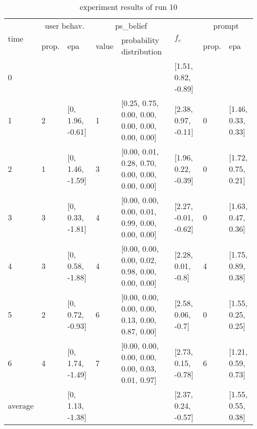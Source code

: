 \begin{table}[htbp]\footnotesize
\caption{experiment results of run 10}
\begin{center}
\begin{tabular}{|p{0.4cm}|p{0.6cm}|l|p{0.6cm}|p{3.3cm}|l|p{0.6cm}|l|}
\hline

\multirow{2}{*}{time} & \multicolumn{2}{c|}{user behav.} & \multicolumn{2}{c|}{ps\_belief} &
\multirow{2}{*}{$f_c$} & \multicolumn{2}{c|}{prompt} \\ \cline{2-5}\cline{ 7- 8}
& prop. & epa & value & probability distribution &  & prop. & epa \\ \hline

0 & \multicolumn{1}{l|}{} &  & \multicolumn{1}{l|}{} &  & [1.51, 0.82, -0.89] & \multicolumn{1}{l|}{} &  \\ \hline
1 & 2 & [0, 1.96, -0.61] & 1 & [0.25, 0.75, 0.00, 0.00, 0.00, 0.00, 0.00, 0.00] & [2.38, 0.97, -0.11] & 0 & [1.46, 0.33, 0.33] \\ \hline
2 & 1 & [0, 1.46, -1.59] & 3 & [0.00, 0.01, 0.28, 0.70, 0.00, 0.00, 0.00, 0.00] & [1.96, 0.22, -0.39] & 0 & [1.72, 0.75, 0.21] \\ \hline
3 & 3 & [0, 0.33, -1.81] & 4 & [0.00, 0.00, 0.00, 0.01, 0.99, 0.00, 0.00, 0.00] & [2.27, -0.01, -0.62] & 0 & [1.63, 0.47, 0.36] \\ \hline
4 & 3 & [0, 0.58, -1.88] & 4 & [0.00, 0.00, 0.00, 0.02, 0.98, 0.00, 0.00, 0.00] & [2.28, 0.01, -0.8] & 4 & [1.75, 0.89, 0.38] \\ \hline
5 & 2 & [0, 0.72, -0.93] & 6 & [0.00, 0.00, 0.00, 0.00, 0.13, 0.00, 0.87, 0.00] & [2.58, 0.06, -0.7] & 0 & [1.55, 0.25, 0.25] \\ \hline
6 & 4 & [0, 1.74, -1.49] & 7 & [0.00, 0.00, 0.00, 0.00, 0.00, 0.03, 0.01, 0.97] & [2.73, 0.15, -0.78] & 6 & [1.21, 0.59, 0.73] \\ \hline
\multicolumn{1}{|l|}{average} & \multicolumn{1}{l|}{} & [0, 1.13, -1.38] & \multicolumn{1}{l|}{} &  & [2.37, 0.24, -0.57] & \multicolumn{1}{l|}{} & [1.55, 0.55, 0.38] \\ \hline
\end{tabular}
\end{center}
\label{}
\end{table}



